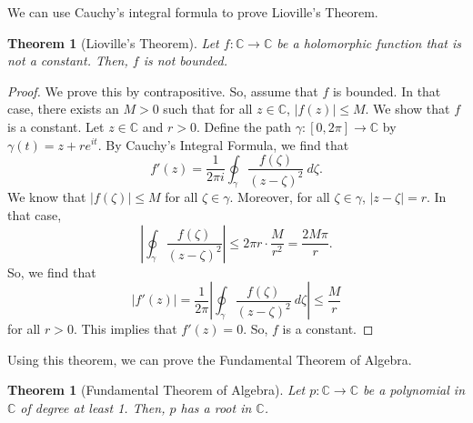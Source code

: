 \documentclass[a4paper, openany]{memoir}
\theoremstyle{definition}
\theoremstyle{plain}
\newtheorem{theorem}[definition]{Theorem}
\begin{document}
We can use Cauchy's integral formula to prove Lioville's Theorem.
\begin{theorem}[Lioville's Theorem]
Let $f: \mathbb{C} \to \mathbb{C}$ be a holomorphic function that is not a constant. Then, $f$ is not bounded.
\end{theorem}
\begin{proof}
We prove this by contrapositive. So, assume that $f$ is bounded. In that case, there exists an $M > 0$ such that for all $z \in \mathbb{C}$, $|f(z)| \leq M$. We show that $f$ is a constant. Let $z \in \mathbb{C}$ and $r > 0$. Define the path $\gamma: [0, 2\pi] \to \mathbb{C}$ by $\gamma(t) = z + re^{it}$. By Cauchy's Integral Formula, we find that
\[f'(z) = \frac{1}{2\pi i} \oint_\gamma \frac{f(\zeta)}{(z - \zeta)^2} \ d\zeta.\]
We know that $|f(\zeta)| \leq M$ for all $\zeta \in \gamma$. Moreover, for all $\zeta \in \gamma$, $|z - \zeta| = r$. In that case,
\[\left|\oint_\gamma \frac{f(\zeta)}{(z - \zeta)^2}\right| \leq 2\pi r \cdot \frac{M}{r^2} = \frac{2M \pi}{r}.\]
So, we find that
\[|f'(z)| = \frac{1}{2\pi} \left|\oint_\gamma \frac{f(\zeta)}{(z - \zeta)^2} \ d\zeta\right| \leq \frac{M}{r}\]
for all $r > 0$. This implies that $f'(z) = 0$. So, $f$ is a constant.
\end{proof}
\noindent Using this theorem, we can prove the Fundamental Theorem of Algebra.
\begin{theorem}[Fundamental Theorem of Algebra]
Let $p: \mathbb{C} \to \mathbb{C}$ be a polynomial in $\mathbb{C}$ of degree at least 1. Then, $p$ has a root in $\mathbb{C}$.
\end{theorem}
\end{document}
